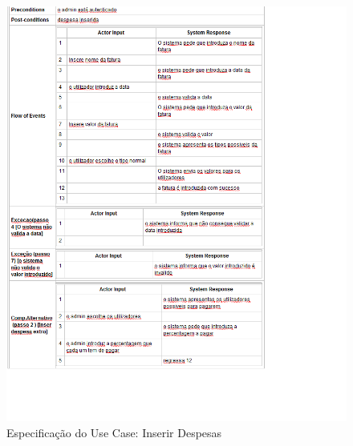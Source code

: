 \begin{figure}[htb!]
	\centering
	\includegraphics[scale=0.7]{imagens/Especificacoes/inserirdespesas}  
	\caption{Especificação do Use Case: Inserir Despesas}  
\end{figure}


